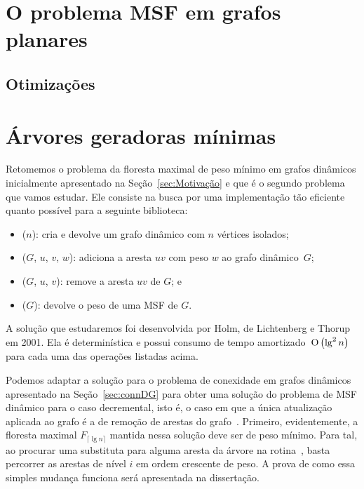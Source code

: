 
\chapter{O problema MSF em grafos planares}








\section{Otimizações}



\chapter{Árvores geradoras mínimas}

Retomemos o problema da floresta maximal de peso mínimo em grafos dinâmicos inicialmente apresentado na Seção~\ref{sec:Motivação} e que é o segundo problema que vamos estudar. Ele consiste na busca por uma implementação tão eficiente quanto possível para a seguinte biblioteca:
\begin{itemize}
\item \MSFCreate($n$): cria e devolve um grafo dinâmico com $n$ vértices isolados;
\item \MSFaddEdge($G$, $u$, $v$, $w$): adiciona a aresta $uv$ com peso $w$ ao grafo dinâmico~$G$;
\item \MSFdelEdge($G$, $u$, $v$): remove a aresta $uv$ de $G$; e
\item \MSFweight($G$): devolve o peso de uma MSF de $G$.
\end{itemize}

A solução que estudaremos foi desenvolvida por Holm, de Lichtenberg e Thorup~\cite{poly_log} em 2001. Ela é determinística e possui consumo de tempo amortizado~$\text{O}\left(\lg^2 n\right)$ para cada uma das operações listadas acima.

Podemos adaptar a solução para o problema de conexidade em grafos dinâmicos apresentado na Seção~\ref{sec:connDG} para obter uma solução do problema de MSF dinâmico para o caso decremental, isto é, o caso em que a única atualização aplicada ao grafo é a de remoção de arestas do grafo~\cite{poly_log}. Primeiro, evidentemente, a floresta maximal $F_{\lceil \lg n \rceil}$ mantida nessa solução deve ser de peso mínimo. Para tal, ao procurar uma substituta para alguma aresta da árvore na rotina~\dymGraphReplace{}, basta percorrer as arestas de nível $i$ em ordem crescente de peso. A prova de como essa simples mudança funciona será apresentada na dissertação.

